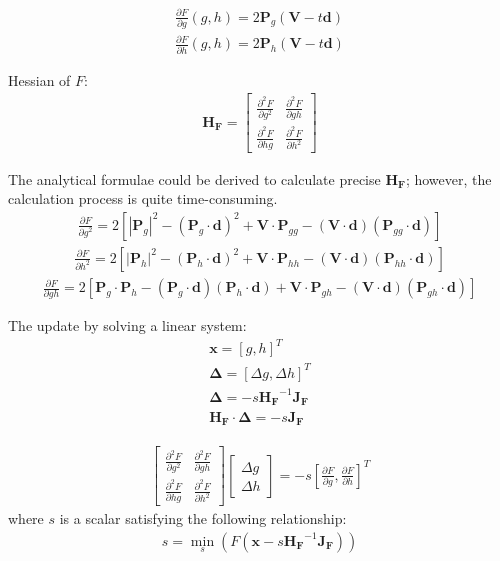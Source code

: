 \documentclass[preprint,12pt]{interact}
\begin{document}
\begin{align}
	\frac{\partial F}{\partial g} (g,h) = 2  \bm{P}_g \left( \bm{V} - t \bm{d} \right) \\
	\frac{\partial F}{\partial h} (g,h) = 2  \bm{P}_h \left( \bm{V} - t \bm{d} \right)
\end{align} 



Hessian of $F$:
\begin{align}
	\bm{H_F} = 
	\begin{bmatrix}
        \frac{\partial^2 F}{\partial g^2} & \frac{\partial^2 F}{\partial gh} \\
		 \frac{\partial^2 F}{\partial hg} & \frac{\partial^2 F}{\partial h^2}
	\end{bmatrix}  
\end{align}

The analytical formulae could be derived to calculate precise $\bm{H_F}$; however, the calculation process is quite time-consuming.
\begin{align}
	\frac{\partial F}{\partial g^2} = 2 \left[ \left| \bm{P}_g \right|^2 - (\bm{P}_g \cdot \bm{d})^2 + \bm{V} \cdot \bm{P}_{gg} - (\bm{V} \cdot \bm{d}) (\bm{P}_{gg} \cdot \bm{d}) \right]
\end{align}
\begin{align}
	\frac{\partial F}{\partial h^2} = 2 \left[ \left| \bm{P}_h \right|^2 - (\bm{P}_h \cdot \bm{d})^2 + \bm{V} \cdot \bm{P}_{hh} - (\bm{V} \cdot \bm{d}) (\bm{P}_{hh} \cdot \bm{d}) \right]
\end{align}
\begin{align}
	\frac{\partial F}{\partial gh} = 2 \left[ \bm{P}_g \cdot \bm{P}_h - (\bm{P}_g \cdot \bm{d}) (\bm{P}_h \cdot \bm{d}) + \bm{V} \cdot \bm{P}_{gh} - (\bm{V} \cdot \bm{d}) (\bm{P}_{gh} \cdot \bm{d}) \right]
\end{align}


The update by solving a linear system:
\begin{align}
	\bm{x} = \left[ g, h \right]^T \\
	\bm{\Delta} = \left[ \Delta g, \Delta h \right]^T \\
	\bm{\Delta} = - s \bm{H_F}^{-1} \bm{J_F} \\
	\bm{H_F} \cdot \bm{\Delta} = - s \bm{J_F}
\end{align}

\begin{align}
	\begin{bmatrix}
	\frac{\partial^2 F}{\partial g^2} & \frac{\partial^2 F}{\partial gh} \\
	\frac{\partial^2 F}{\partial hg} & \frac{\partial^2 F}{\partial h^2}
\end{bmatrix}  
	\begin{bmatrix}
		\Delta g \\
		\Delta h
	\end{bmatrix} = - s \left[ \frac{\partial F}{\partial g}, \frac{\partial F}{\partial h} \right]^T
\end{align}
where $s$ is a scalar satisfying the following relationship:
\begin{align}
	s = \min_{s} \left( F \left( \bm{x} - s \bm{H_F}^{-1} \bm{J_F} \right) \right)
\end{align}
\end{document}
